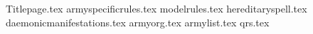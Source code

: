 \documentclass[a4paper,10pt]{article}
\begin{document}
{Titlepage.tex}
{armyspecificrules.tex}
\additionalspacebeforemaintitle{}
{modelrules.tex}
\additionalspacebeforemaintitle{}
{hereditaryspell.tex}
\newpage
{daemonicmanifestations.tex}
\newpage
{armyorg.tex}
\additionalspacebeforemaintitle{}
{armylist.tex}
\newpage
{qrs.tex}
\end{document}

